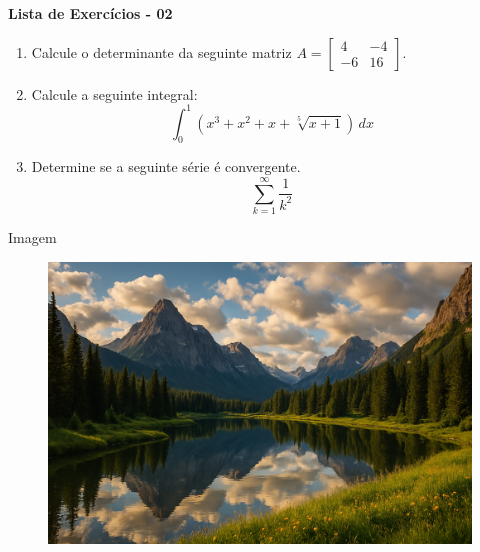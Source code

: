 \documentclass[a4paper]{article}
\begin{document}
\begin{center}
    \textbf{Lista de Exercícios - 02}    
\end{center}

\begin{enumerate}

\item Calcule o determinante da seguinte matriz $A = 
\begin{bmatrix}
 4 & -4 \\
-6 & 16
\end{bmatrix}$.

\item Calcule a seguinte integral:
\[
\int_0^1 \left( x^3 + x^2 + x + \sqrt[5]{x+1} \right) \, dx
\]

\item Determine se a seguinte série é convergente.
\[
\sum_{k=1}^{\infty} \frac{1}{k^2}
\]

\end{enumerate}
\newpage

Imagem
\begin{figure}[h]
    \includegraphics[angle=0, scale=0.15]{imagens/gpt.png}
\end{figure}
\end{document}
